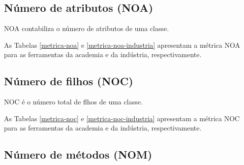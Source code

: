 \subsection{Número de atributos (NOA)}

NOA contabiliza o número de atributos de uma classe.

As Tabelas \ref{metrica-noa} e \ref{metrica-noa-industria} apresentam a
métrica NOA para as ferramentas da academia e da indústria, respectivamente.



\subsection{Número de filhos (NOC)}

NOC é o número total de flhos de uma classe.

As Tabelas \ref{metrica-noc} e \ref{metrica-noc-industria} apresentam a
métrica NOC para as ferramentas da academia e da indústria, respectivamente.



\subsection{Número de métodos (NOM)}


